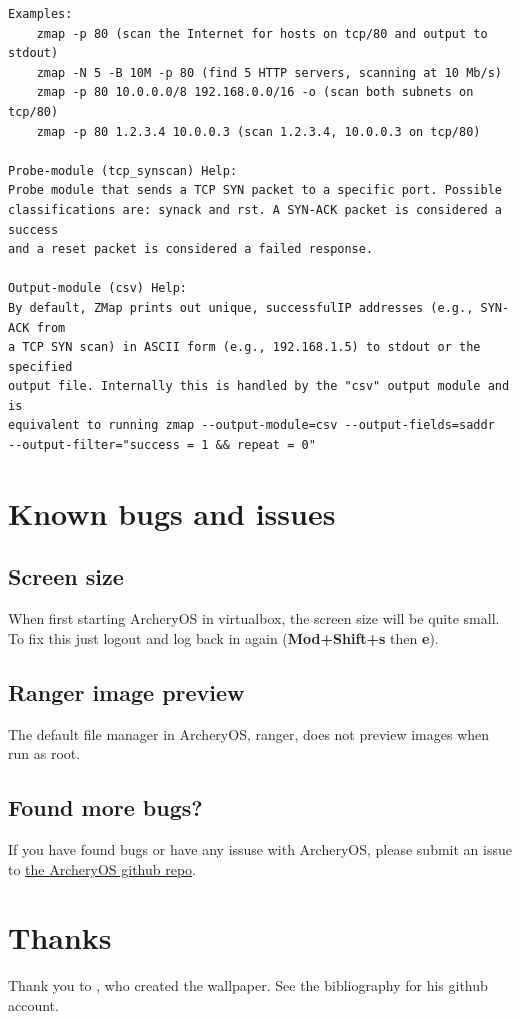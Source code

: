 \documentclass{article}
\begin{document}
\begin{lstlisting}
Examples:
    zmap -p 80 (scan the Internet for hosts on tcp/80 and output to stdout)
    zmap -N 5 -B 10M -p 80 (find 5 HTTP servers, scanning at 10 Mb/s)
    zmap -p 80 10.0.0.0/8 192.168.0.0/16 -o (scan both subnets on tcp/80)
    zmap -p 80 1.2.3.4 10.0.0.3 (scan 1.2.3.4, 10.0.0.3 on tcp/80)

Probe-module (tcp_synscan) Help:
Probe module that sends a TCP SYN packet to a specific port. Possible 
classifications are: synack and rst. A SYN-ACK packet is considered a success 
and a reset packet is considered a failed response.

Output-module (csv) Help:
By default, ZMap prints out unique, successfulIP addresses (e.g., SYN-ACK from 
a TCP SYN scan) in ASCII form (e.g., 192.168.1.5) to stdout or the specified 
output file. Internally this is handled by the "csv" output module and is 
equivalent to running zmap --output-module=csv --output-fields=saddr 
--output-filter="success = 1 && repeat = 0"
\end{lstlisting}


\pagebreak
\section{Known bugs and issues}
\subsection{Screen size}
When first starting ArcheryOS in virtualbox, the screen size will be quite small. To fix this just logout and log back in again (\textbf{Mod+Shift+s} then \textbf{e}).
\subsection{Ranger image preview}
The default file manager in ArcheryOS, ranger, does not preview images when run as root.

\subsection{Found more bugs?}
If you have found bugs or have any issuse with ArcheryOS, please submit an issue to \href{https://github.com/H0ll0wp0int/ArcheryOS-build-files}{the ArcheryOS github repo}.



\pagebreak
\section{Thanks}
Thank you to \textcite{Wallpape}, who created the wallpaper. See the bibliography for his github account.

\pagebreak
\printbibliography
\end{document}
